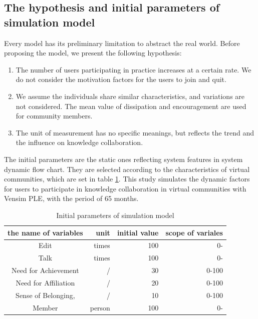 \documentclass[doublespacing]{elsarticle}
\begin{document}
\subsection{The hypothesis and initial parameters of  simulation model }
\label{sec:hypoth-param-wiki}
Every model has its preliminary limitation to abstract the real
world. Before proposing the model, we present the following hypothesis:
\begin{enumerate}
\item The number of users participating in practice increases at a certain rate. We do not consider the motivation factors for the users to join and quit. 
\item   We assume the individuals share similar characteristics, and variations
  are not considered. The mean value of dissipation and encouragement are 
  used  for community members. 
\item The unit of measurement has no specific meanings, but reflects the trend and the influence on knowledge collaboration.
\end{enumerate}

The initial parameters are the static ones reflecting system features in system dynamic flow chart. They are selected according to the characteristics of virtual communities, which are set in table \ref{tab:init-params}. This study simulates the dynamic factors for users to participate in knowledge collaboration in virtual communities with Vensim PLE, with the period of 65 months.
\begin{table}[htpb]
  \centering

\begin{tabular}{crrr}
    \addlinespace
    \toprule
    {\bf the name of variables} & {\bf unit} & {\bf initial value} & {\bf scope of variales} \\
    \midrule
    Edit  & times    & 100   & 0- \\
    Talk  & times  & 100   & 0- \\
    Need for Achievement & /     & 30    & 0-100 \\
    Need for Affiliation & /     & 20    & 0-100 \\
    Sense of Belonging, & /     & 10    & 0-100 \\
    Member & person   & 100   & 0- \\
    \bottomrule
    \end{tabular}
  \caption{Initial parameters of  simulation model }
 \label{tab:init-params}
\end{table}
\end{document}
